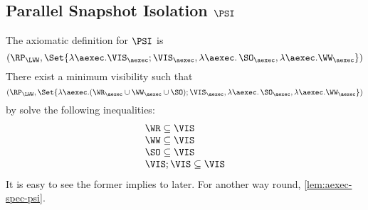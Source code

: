 \subsection{Parallel Snapshot Isolation \(\PSI\)}
\label{sec:sound-complete-psi}

The axiomatic definition for \( \PSI \) is 
\[ 
    (\RP_{\LWW}, \Set{\lambda \aexec. \VIS_{\aexec} ; \VIS_{\aexec}, \lambda \aexec \ldotp \SO_\aexec, \lambda \aexec. \WW_\aexec })
\]
There exist a minimum visibility such that 
\[ 
    (\RP_{\LWW}, \Set{\lambda \aexec. (\WR_{\aexec} \cup \WW_{\aexec} \cup \SO ) ; \VIS_{\aexec}, \lambda \aexec \ldotp \SO_\aexec, \lambda \aexec. \WW_\aexec })
\]
by solve the following inequalities:
\[
    \begin{array}{@{}l@{}}
        \WR \subseteq \VIS \\
        \WW \subseteq \VIS \\
        \SO \subseteq \VIS \\
        \VIS ; \VIS \subseteq \VIS 
    \end{array}
\]
It is easy to see the former implies to later.
For another way round, \cref{lem:aexec-spec-psi}.

